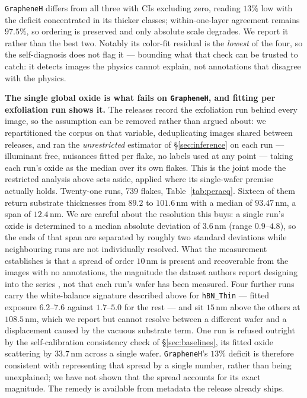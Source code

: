 \documentclass[10pt]{article}
\begin{document}
\texttt{GrapheneH} differs from all three with CIs excluding zero, reading $13\%$ low with the deficit concentrated in its thicker classes; within-one-layer agreement remains $97.5\%$, so ordering is preserved and only absolute scale degrades. We report it rather than the best two. Notably its color-fit residual is the \emph{lowest} of the four, so the self-diagnosis does not flag it --- bounding what that check can be trusted to catch: it detects images the physics cannot explain, not annotations that disagree with the physics.

\textbf{The single global oxide is what fails on \texttt{GrapheneH}, and fitting per
exfoliation run shows it.} The releases record the exfoliation run behind every image,
so the assumption can be removed rather than argued about: we repartitioned the corpus on that variable, deduplicating images shared between releases, and ran the \emph{unrestricted} estimator of \S\ref{sec:inference} on each run --- illuminant free, nuisances fitted per flake, no labels used at any point --- taking each run's oxide as the median over its own flakes. This is the joint mode the restricted analysis above sets aside, applied where its single-wafer premise actually holds. Twenty-one runs, 739 flakes, Table~\ref{tab:peracq}. Sixteen of them return substrate thicknesses from $89.2$ to $101.6$\,nm with a median of $93.47$\,nm, a span of $12.4$\,nm. We are careful about the resolution this buys: a single run's oxide is determined to a median absolute deviation of $3.6$\,nm (range $0.9$--$4.8$), so the ends of that span are separated by roughly two standard deviations while neighbouring runs are not individually resolved. What the measurement establishes is that a spread of order $10$\,nm is present and recoverable from the images with no annotations, the magnitude the dataset authors report designing into the series \cite{uslu2024maskterial}, not that each run's wafer has been measured. Four further runs carry the
white-balance signature described above for \texttt{hBN\_Thin} --- fitted exposure
$6.2$--$7.6$ against $1.7$--$5.0$ for the rest --- and sit $15$\,nm above the others at
$108.5$\,nm, which we report but cannot resolve between a different wafer and a
displacement caused by the vacuous substrate term. One run is refused outright by the
self-calibration consistency check of \S\ref{sec:baselines}, its fitted oxide
scattering by $33.7$\,nm across a single wafer. \texttt{GrapheneH}'s $13\%$ deficit is therefore consistent with representing that spread by a single number, rather than being unexplained; we have not shown that the spread accounts for its exact magnitude. The remedy is available from metadata the release already ships.
\end{document}
